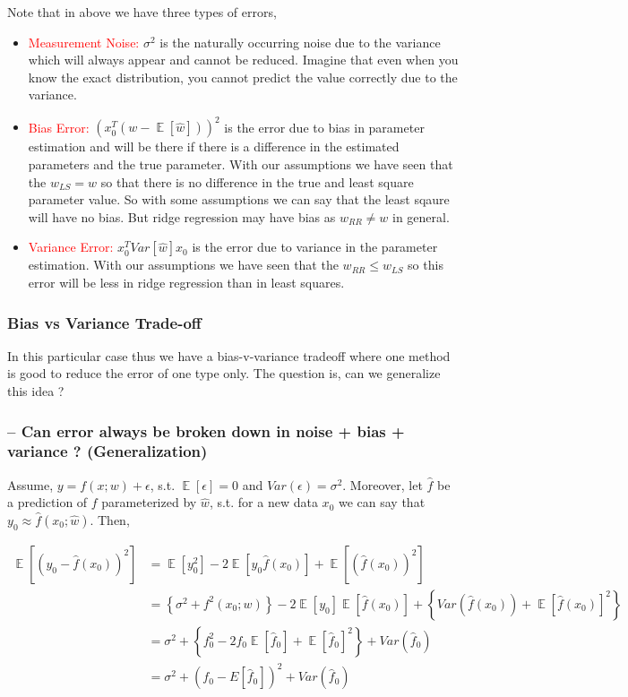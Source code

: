\documentclass{article}
\DeclareMathOperator*{\E}{\mathop{\mathbb{E}}}
\newcommand{\red}[1]{\textcolor{red}{#1}}
\begin{document}
Note that in above we have three types of errors,
\begin{itemize}
    \item \red{Measurement Noise:} $\sigma^2$ is the naturally occurring noise due to the variance which will always appear and cannot be reduced. Imagine that even when you know the exact distribution, you cannot predict the value correctly due to the variance.
    \item \red{Bias Error:} $(x_0^T (w - \E[\hat{w}]))^2$ is the error due to bias in parameter estimation and will be there if there is a difference in the estimated parameters and the true parameter. With our assumptions we have seen that the $w_{LS}=w$ so that there is no difference in the true and least square parameter value. So with some assumptions we can say that the least sqaure will have no bias. But ridge regression may have bias as $w_{RR} \neq w$ in general.
    \item \red{Variance Error:} $x_0^T Var[\hat{w}]x_0$ is the error due to variance in the parameter estimation. With our assumptions we have seen that the $w_{RR} \leq w_{LS}$ so this error will be less in ridge regression than in least squares.
\end{itemize}

\subsubsection{Bias vs Variance Trade-off}
In this particular case thus we have a bias-v-variance tradeoff where one method is good to reduce the error of one type only. The question is, can we generalize this idea ?

\subsubsection{-- Can error always be broken down in noise + bias + variance ? (Generalization)}
Assume, $y = f(x;w)+\epsilon$, s.t. $\E[\epsilon]=0$ and $Var(\epsilon)=\sigma^2$. Moreover, let $\hat{f}$ be a prediction of $f$ parameterized by $\hat{w}$, s.t. for a new data $x_0$ we can say that $y_0 \approx \hat{f}(x_0; \hat{w})$. Then,

\begin{align*}
    \E[(y_0-\hat{f}(x_0))^2] &= \E[y_0^2] - 2\E[y_0\hat{f}(x_0)] + \E[(\hat{f}(x_0))^2]\\
    &= \left\{ \sigma^2 + f^2(x_0;w) \right\} - 2\E[y_0]\E[\hat{f}(x_0)] + \left\{ Var(\hat{f}(x_0)) + \E[\hat{f}(x_0)]^2 \right\}\\
    &= \sigma^2 + \left\{ f_0^2 - 2f_0\E[\hat{f}_0] + \E[\hat{f}_0]^2 \right\} + Var(\hat{f}_0)\\
    &= \sigma^2 + (f_0 - E[\hat{f}_0])^2 + Var(\hat{f}_0)\\
\end{align*}
\end{document}
